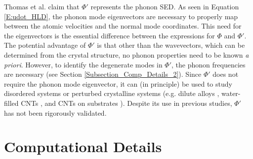 Thomas et al. \cite{thomas_predicting_2010} claim that $\Phi'$ 
represents the phonon SED. As seen in 
Equation \eqref{E:udot_HLD}, the phonon mode eigenvectors are necessary 
to properly map
 between the atomic velocities and the normal mode coordinates. This need 
 for the eigenvectors 
is the essential difference between the expressions for $\Phi$ and $\Phi'$. 
The potential 
advantage of $\Phi'$ is that other than the wavevectors, which can be 
determined from the 
crystal structure, no phonon properties need to be known {\em a priori}. 
However, to identify 
the degenerate modes in $\Phi'$, the phonon frequencies are necessary 
(see Section 
\ref{Subsection_Comp_Details_2}). Since $\Phi'$ does not require the phonon 
mode eigenvector, 
it can (in principle) be used to study disordered systems or perturbed 
crystalline systems 
(e.g. dilute alloys \cite{shiomi_thermal_2011}, water-filled CNTs 
\cite{thomas_predicting_2010}, and CNTs on 
substrates \cite{ong_reduction_2011}). Despite its use in previous studies, 
$\Phi'$ has not been 
rigorously validated.
\section{\label{Section_Comp}Computational Details}
